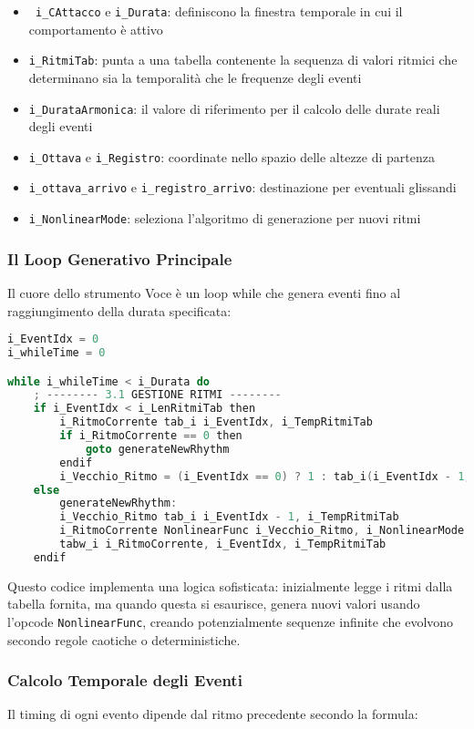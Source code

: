 \begin{itemize}
    \item \texttt{ i\_CAttacco}  e \texttt{i\_Durata}: definiscono la finestra temporale in cui il comportamento è attivo
    \item \texttt{i\_RitmiTab}: punta a una tabella contenente la sequenza di valori ritmici che determinano sia la temporalità che le frequenze degli eventi
    \item \texttt{i\_DurataArmonica}: il valore di riferimento per il calcolo delle durate reali degli eventi
    \item \texttt{i\_Ottava} e \texttt{i\_Registro}: coordinate nello spazio delle altezze di partenza
    \item \texttt{i\_ottava\_arrivo} e \texttt{i\_registro\_arrivo}: destinazione per eventuali glissandi
    \item \texttt{i\_NonlinearMode}: seleziona l'algoritmo di generazione per nuovi ritmi
\end{itemize}
\subsubsection{Il Loop Generativo Principale}
Il cuore dello strumento Voce è un loop while che genera eventi fino al raggiungimento della durata specificata:

\begin{lstlisting}[language=C]
i_EventIdx = 0
i_whileTime = 0

while i_whileTime < i_Durata do
    ; -------- 3.1 GESTIONE RITMI --------
    if i_EventIdx < i_LenRitmiTab then
        i_RitmoCorrente tab_i i_EventIdx, i_TempRitmiTab
        if i_RitmoCorrente == 0 then
            goto generateNewRhythm
        endif
        i_Vecchio_Ritmo = (i_EventIdx == 0) ? 1 : tab_i(i_EventIdx - 1, i_TempRitmiTab)
    else
        generateNewRhythm:
        i_Vecchio_Ritmo tab_i i_EventIdx - 1, i_TempRitmiTab
        i_RitmoCorrente NonlinearFunc i_Vecchio_Ritmo, i_NonlinearMode
        tabw_i i_RitmoCorrente, i_EventIdx, i_TempRitmiTab
    endif
\end{lstlisting}

Questo codice implementa una logica sofisticata: inizialmente legge i ritmi dalla tabella fornita, ma quando questa si esaurisce, genera nuovi valori usando l'opcode \texttt{NonlinearFunc}, creando potenzialmente sequenze infinite che evolvono secondo regole caotiche o deterministiche.
\subsubsection{Calcolo Temporale degli Eventi}
Il timing di ogni evento dipende dal ritmo precedente secondo la formula:

